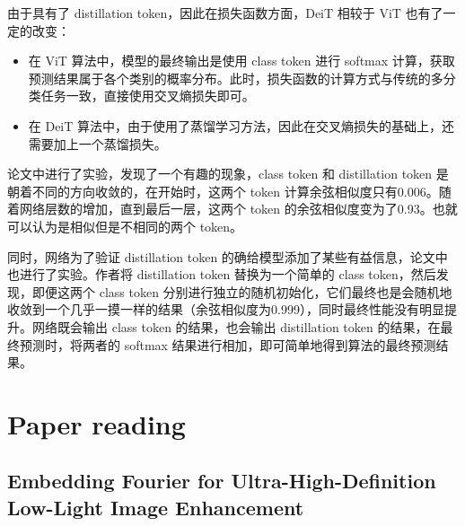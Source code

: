 \documentclass[letterpaper,10pt]{article}
\begin{document}
	由于具有了 distillation token，因此在损失函数方面，DeiT 相较于 ViT 也有了一定的改变：
	
	\begin{itemize}
		\item{}
			在 ViT 算法中，模型的最终输出是使用 class token 进行 softmax 计算，获取预测结果属于各个类别的概率分布。此时，损失函数的计算方式与传统的多分类任务一致，直接使用交叉熵损失即可。
		\item{}
			在 DeiT 算法中，由于使用了蒸馏学习方法，因此在交叉熵损失的基础上，还需要加上一个蒸馏损失。
	\end{itemize}
	
	论文中进行了实验，发现了一个有趣的现象，class token 和 distillation token 是朝着不同的方向收敛的，在开始时，这两个 token 计算余弦相似度只有0.006。随着网络层数的增加，直到最后一层，这两个 token 的余弦相似度变为了0.93。也就可以认为是相似但是不相同的两个 token。
	
	同时，网络为了验证 distillation token 的确给模型添加了某些有益信息，论文中也进行了实验。作者将 distillation token 替换为一个简单的 class token，然后发现，即便这两个 class token 分别进行独立的随机初始化，它们最终也是会随机地收敛到一个几乎一摸一样的结果（余弦相似度为0.999），同时最终性能没有明显提升。网络既会输出 class token 的结果，也会输出 distillation token 的结果，在最终预测时，将两者的 softmax 结果进行相加，即可简单地得到算法的最终预测结果。
	

	
	\section{Paper reading}
	
	\subsection{Embedding Fourier for Ultra-High-Definition Low-Light Image Enhancement \cite{li2023embedding}}
	
\end{document}
